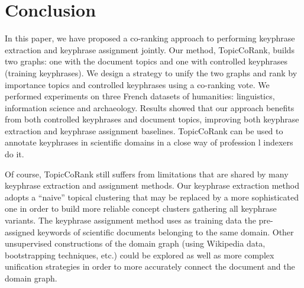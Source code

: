 \section{Conclusion}
\label{sec:conclusion}
     In this paper, we have proposed a co-ranking approach to performing keyphrase
  extraction and keyphrase assignment jointly. Our method,
  TopicCoRank, builds two graphs: one with the
  document topics and one with controlled keyphrases (training keyphrases). We
  design a strategy to unify the two graphs and rank by importance topics and
  controlled keyphrases using a co-ranking vote.
  We performed experiments on three French datasets of  humanities:  linguistics, information science and archaeology. Results showed that our approach benefits from both controlled
  keyphrases and document topics, improving both keyphrase extraction and keyphrase assignment
  baselines. TopicCoRank can be used to annotate keyphrases in scientific domains in a close way of profession l indexers do it.
    
    Of course,   TopicCoRank still suffers from limitations that are shared by many keyphrase extraction and assignment methods.  Our keyphrase extraction method adopts a ``naive'' topical clustering that may be replaced by a more sophisticated one in order to build more reliable concept clusters gathering all keyphrase variants.  The keyphrase assignment method uses as training data the pre-assigned keywords of scientific documents belonging to the same domain. Other  unsupervised constructions of the domain graph (using Wikipedia data, bootstrapping techniques, etc.) could be explored as well as  more complex unification strategies in order to more accurately connect the document and the domain graph.


